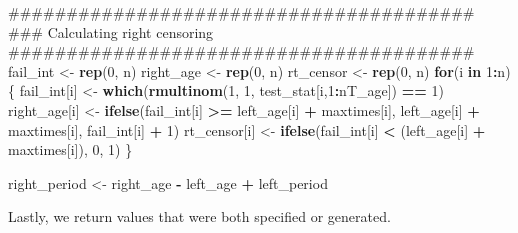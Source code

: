 \documentclass[11pt,]{article}
\newenvironment{Shaded}{\begin{snugshade}}{\end{snugshade}}
\newcommand{\KeywordTok}[1]{\textcolor[rgb]{0.13,0.29,0.53}{\textbf{#1}}}
\newcommand{\DecValTok}[1]{\textcolor[rgb]{0.00,0.00,0.81}{#1}}
\newcommand{\StringTok}[1]{\textcolor[rgb]{0.31,0.60,0.02}{#1}}
\newcommand{\ControlFlowTok}[1]{\textcolor[rgb]{0.13,0.29,0.53}{\textbf{#1}}}
\newcommand{\OperatorTok}[1]{\textcolor[rgb]{0.81,0.36,0.00}{\textbf{#1}}}
\newcommand{\NormalTok}[1]{#1}
\begin{document}
\begin{Shaded}
\begin{Highlighting}[]
\NormalTok{  ########################################}
\NormalTok{  ### Calculating right censoring}
\NormalTok{  ########################################}
\NormalTok{  fail_int <-}\StringTok{ }\KeywordTok{rep}\NormalTok{(}\DecValTok{0}\NormalTok{, n)}
\NormalTok{  right_age <-}\StringTok{ }\KeywordTok{rep}\NormalTok{(}\DecValTok{0}\NormalTok{, n)}
\NormalTok{  rt_censor <-}\StringTok{ }\KeywordTok{rep}\NormalTok{(}\DecValTok{0}\NormalTok{, n)}
  \ControlFlowTok{for}\NormalTok{(i }\ControlFlowTok{in} \DecValTok{1}\OperatorTok{:}\NormalTok{n) \{}
\NormalTok{    fail_int[i] <-}\StringTok{ }\KeywordTok{which}\NormalTok{(}\KeywordTok{rmultinom}\NormalTok{(}\DecValTok{1}\NormalTok{, }\DecValTok{1}\NormalTok{, test_stat[i,}\DecValTok{1}\OperatorTok{:}\NormalTok{nT_age]) }\OperatorTok{==}\StringTok{ }\DecValTok{1}\NormalTok{)}
\NormalTok{    right_age[i] <-}\StringTok{ }\KeywordTok{ifelse}\NormalTok{(fail_int[i] }\OperatorTok{>=}\StringTok{ }\NormalTok{left_age[i] }\OperatorTok{+}\StringTok{ }\NormalTok{maxtimes[i],}
\NormalTok{                           left_age[i] }\OperatorTok{+}\StringTok{ }\NormalTok{maxtimes[i], fail_int[i] }\OperatorTok{+}\StringTok{ }\DecValTok{1}\NormalTok{)}
\NormalTok{    rt_censor[i] <-}\StringTok{ }\KeywordTok{ifelse}\NormalTok{(fail_int[i] }\OperatorTok{<}\StringTok{ }\NormalTok{(left_age[i] }\OperatorTok{+}\StringTok{ }\NormalTok{maxtimes[i]), }\DecValTok{0}\NormalTok{, }\DecValTok{1}\NormalTok{)}
\NormalTok{  \}}

\NormalTok{  right_period <-}\StringTok{ }\NormalTok{right_age }\OperatorTok{-}\StringTok{ }\NormalTok{left_age }\OperatorTok{+}\StringTok{ }\NormalTok{left_period}
\end{Highlighting}
\end{Shaded}

Lastly, we return values that were both specified or generated.
\end{document}
